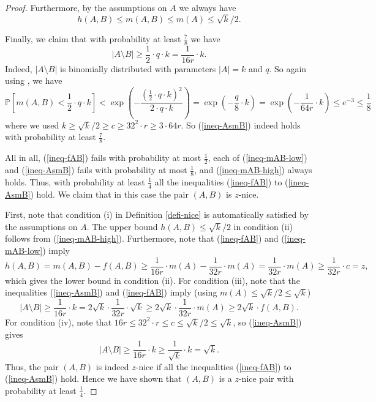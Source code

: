 \begin{proof}
Furthermore, by the assumptions on $A$ we always have
\begin{equation}\label{ineq-mAB-high}
h(A,B)\leq m(A,B)\leq m(A)\leq \sqrt{k}/2.
\end{equation}

Finally, we claim that with probability at least $\frac{7}{8}$ we have
\begin{equation}\label{ineq-AsmB}
\vert A\setminus B\vert\geq \frac{1}{2}\cdot q \cdot k=\frac{1}{16r}\cdot k.
\end{equation}
Indeed, $\vert A\setminus B\vert$ is binomially distributed with parameters $\vert A\vert=k$ and $q$. So again using \cite[Theorem A.1.13]{alon-spencer}, we have 
\[\mathbb{P}\left[m(A,B)< \frac{1}{2}\cdot q \cdot k\right]<\exp\left(-\frac{\left(\frac{1}{2}\cdot q \cdot k\right)^2}{2\cdot q\cdot k}\right)=\exp\left(-\frac{q}{8}\cdot k\right)=\exp\left(-\frac{1}{64r}\cdot k\right)\leq e^{-3}\leq \frac{1}{8}\]
where we used $k\geq \sqrt{k}/2\geq c\geq 32^2\cdot r\geq 3\cdot 64r$. So (\ref{ineq-AsmB}) indeed holds with probability at least $\frac{7}{8}$.

All in all, (\ref{ineq-fAB}) fails with probability at most $\frac{1}{2}$,  each of (\ref{ineq-mAB-low}) and  (\ref{ineq-AsmB}) fails with probability at most $\frac{1}{8}$, and (\ref{ineq-mAB-high}) always holds. Thus, with probability at least $\frac{1}{4}$ all the inequalities (\ref{ineq-fAB}) to (\ref{ineq-AsmB}) hold. We claim that in this case the pair $(A,B)$ is $z$-nice.

First, note that condition (i) in Definition \ref{defi-nice} is automatically satisfied by the assumptions on $A$. The upper bound $h(A,B)\leq \sqrt{k}/2$ in condition (ii) follows from (\ref{ineq-mAB-high}). Furthermore, note that (\ref{ineq-fAB}) and (\ref{ineq-mAB-low}) imply
\[h(A,B)=m(A,B)-f(A,B)\geq \frac{1}{16r}\cdot m(A)-\frac{1}{32r}\cdot m(A)=\frac{1}{32r}\cdot m(A)\geq \frac{1}{32r}\cdot c=z,\]
which gives the lower bound in condition (ii). For condition (iii), note that the inequalities (\ref{ineq-AsmB}) and (\ref{ineq-fAB}) imply (using $m(A)\leq \sqrt{k}/2\leq \sqrt{k}$)
\[\vert A\setminus B\vert\geq \frac{1}{16r}\cdot k=2\sqrt{k}\cdot \frac{1}{32r}\cdot \sqrt{k}\geq 
2\sqrt{k}\cdot \frac{1}{32r}\cdot m(A)\geq 2\sqrt{k}\cdot f(A,B).\]
For condition (iv), note that $16r\leq 32^2\cdot r\leq c\leq \sqrt{k}/2\leq \sqrt{k}$, so (\ref{ineq-AsmB}) gives
\[\vert A\setminus B\vert\geq \frac{1}{16r}\cdot k\geq \frac{1}{\sqrt{k}}\cdot k=\sqrt{k}.\]
Thus, the pair $(A,B)$ is indeed $z$-nice if all the inequalities (\ref{ineq-fAB}) to (\ref{ineq-AsmB}) hold. Hence we have shown that $(A,B)$ is a $z$-nice pair with probability at least $\frac{1}{4}$.
\end{proof}

